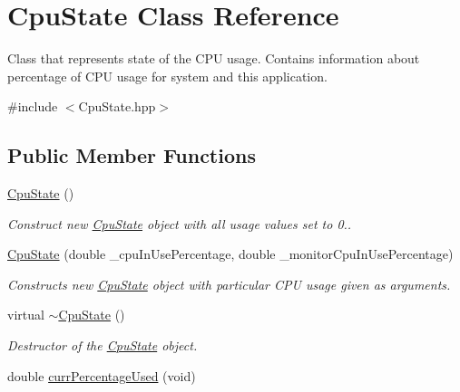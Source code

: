 \hypertarget{classCpuState}{}\section{Cpu\+State Class Reference}
\label{classCpuState}


Class that represents state of the C\+PU usage. Contains information about percentage of C\+PU usage for system and this application.  




{\ttfamily \#include $<$Cpu\+State.\+hpp$>$}

\subsection*{Public Member Functions}
\begin{DoxyCompactItemize}
\item 
\hyperlink{classCpuState_a79069c42dd6978393a04821bcfc14944}{Cpu\+State} ()\hypertarget{classCpuState_a79069c42dd6978393a04821bcfc14944}{}\label{classCpuState_a79069c42dd6978393a04821bcfc14944}

\begin{DoxyCompactList}\small\item\em Construct new \hyperlink{classCpuState}{Cpu\+State} object with all usage values set to 0.. \end{DoxyCompactList}\item 
\hyperlink{classCpuState_a3b167aab35c977484af7a1288868538a}{Cpu\+State} (double \+\_\+cpu\+In\+Use\+Percentage, double \+\_\+monitor\+Cpu\+In\+Use\+Percentage)\hypertarget{classCpuState_a3b167aab35c977484af7a1288868538a}{}\label{classCpuState_a3b167aab35c977484af7a1288868538a}

\begin{DoxyCompactList}\small\item\em Constructs new \hyperlink{classCpuState}{Cpu\+State} object with particular C\+PU usage given as arguments. \end{DoxyCompactList}\item 
virtual \hyperlink{classCpuState_ab8d5207b7ae36102136887d06bf30f5e}{$\sim$\+Cpu\+State} ()\hypertarget{classCpuState_ab8d5207b7ae36102136887d06bf30f5e}{}\label{classCpuState_ab8d5207b7ae36102136887d06bf30f5e}

\begin{DoxyCompactList}\small\item\em Destructor of the \hyperlink{classCpuState}{Cpu\+State} object. \end{DoxyCompactList}\item 
double \hyperlink{classCpuState_a37925c37362e0857655eb02bea295af6}{curr\+Percentage\+Used} (void)\hypertarget{classCpuState_a37925c37362e0857655eb02bea295af6}{}\label{classCpuState_a37925c37362e0857655eb02bea295af6}


\end{DoxyCompactItemize}
